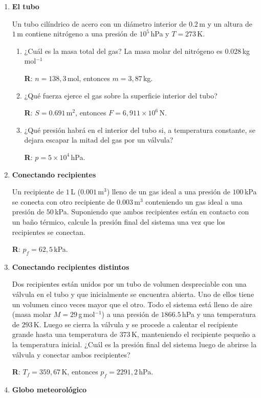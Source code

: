 \documentclass[a4paper,12pt]{article}
\begin{document}
\begin{enumerate}
	\item {\bf{El tubo}}
		
		Un tubo cilíndrico de acero con un diámetro interior de $0.2$\,m y un
		altura de $1$\,m contiene nitrógeno a una presión de $10^5$\,hPa y
		$T=273$\,K.

		\begin{enumerate}
			\item ¿Cuál es la masa total del gas? La masa molar del nitrógeno
				es $0.028$\,kg\,mol$^{-1}$
				
				{\bf R}: $n=138,3$\,mol, entonces $m=3,87$\,kg.
			\item ¿Qué fuerza ejerce el gas sobre la superficie interior del tubo?
				
				{\bf R}: $S=0.691$\,m$^2$, entonces $F=6,911 \times 10^6$\,N.
			\item ¿Qué presión habrá en el interior del tubo si, a temperatura
				constante, se dejara escapar la mitad del gas por un válvula?
				
				{\bf R}: $p=5 \times 10^4$\,hPa.
		\end{enumerate}
 
	\item {\bf{Conectando recipientes}}

		Un recipiente de $1$\,L ($0.001$\,m$^3$) lleno de un gas ideal a una
		presión de $100$\,kPa se conecta con otro recipiente de $0.003$\,m$^3$
		conteniendo un gas ideal a una presión de $50$\,kPa. Suponiendo que
		ambos recipientes están en contacto con un baño térmico, calcule la
		presión final del sistema una vez que los recipientes se conectan.

		{\bf R}: $p_f = 62,5$\,kPa.
	\item {\bf{Conectando recipientes distintos}}
	
		Dos recipientes están unidos por un tubo de volumen despreciable con
		una válvula en el tubo y que inicialmente se encuentra abierta. Uno de
		ellos tiene un volumen cinco veces mayor que el otro. Todo el sistema
		está lleno de aire (masa molar $M=29$\,g\,mol$^{-1}$) a una presión de
		$1866.5$\,hPa y una temperatura de $293$\,K. Luego se cierra la válvula
		y se procede a calentar el recipiente grande hasta una temperatura de
		$373$\,K, manteniendo el recipiente pequeño a la temperatura inicial.
		¿Cuál es la presión final del sistema luego de abrirse la válvula y
		conectar ambos recipientes? 
	
		{\bf R}: $T_f = 359,67$\,K, entonces $p_f = 2291,2$\,hPa.
	\item {\bf{Globo meteorológico}}
		

\end{enumerate}
\end{document}
